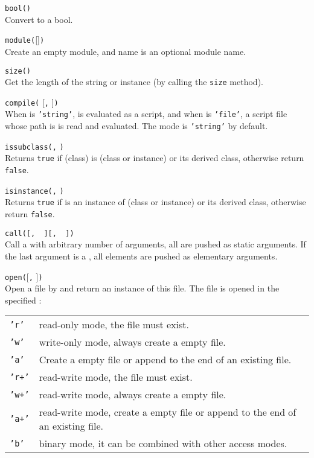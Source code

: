 \hangpar \texttt{bool(}\texttt{)}\\
Convert  to a bool.

\hangpar \texttt{module(}[]\texttt{)}\\
Create an empty module, and name is an optional module name.

\hangpar \texttt{size(}\texttt{)}\\
Get the length of the string or instance (by calling the \texttt{size} method).

\hangpar \texttt{compile(} [\texttt{,} ]\texttt{)}\\
When  is \texttt{'string'},  is evaluated as a script, and when  is \texttt{'file'}, a script file whose path is  is read and evaluated. The mode is \texttt{'string'} by default.

\hangpar \texttt{issubclass(}\texttt{,} \texttt{)}\\
Returns \texttt{true} if  (class) is  (class or instance) or its derived class, otherwise return \texttt{false}.

\hangpar \texttt{isinstance(}\texttt{,} \texttt{)}\\
Returns \texttt{true} if  is an instance of  (class or instance) or its derived class, otherwise return \texttt{false}.

\hangpar \texttt{call(}\texttt{[, }\texttt{ ]}\texttt{[, }\texttt{ ]}\texttt{)}\\
Call a  with arbitrary number of arguments, all  are pushed as static arguments. If the last argument is a , all elements are pushed as elementary arguments.

\hangpar \texttt{open(}[\texttt{,} ]\texttt{)}\\
Open a file by  and return an instance of this file. The file is opened in the specified :\\
\begin{tabular}{@{}lp{}}
    \texttt{'r'} & \textsf{read}-only mode, the file must exist. \\
    \texttt{'w'} & \textsf{write}-only mode, always create a empty file. \\
    \texttt{'a'} & Create a empty file or \textsf{append} to the end of an existing file. \\
    \texttt{'r+'} & \textsf{read}-\textsf{write} mode, the file must exist. \\
    \texttt{'w+'} & \textsf{read}-\textsf{write} mode, always create a empty file. \\
    \texttt{'a+'} & \textsf{read}-\textsf{write} mode, create a empty file or \textsf{append} to the end of an existing file. \\
    \texttt{'b'} & \textsf{binary} mode, it can be combined with other access modes. \\
\end{tabular}

